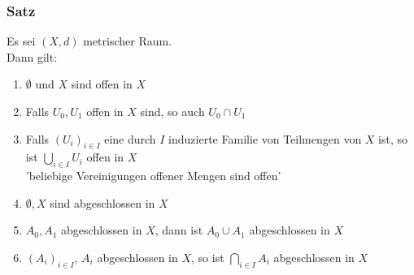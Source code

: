 \subsubsection{Satz} %
\label{ssub:satz}
Es sei $(X,d)$ metrischer Raum. \\
Dann gilt:
\begin{enumerate}
	\item $\emptyset$ und $X$ sind offen in $X$
	\item Falls $U_0,U_1$ offen in $X$ sind, so auch $U_0 \cap U_1$
	\item Falls $(U_i)_{i \in I}$ eine durch $I$ induzierte Familie von Teilmengen von $X$ ist, so ist $\bigcup\limits_{i \in I}U_i$ offen in $X$ \\
		'beliebige Vereinigungen offener Mengen sind offen'
	\item $\emptyset,X$ sind abgeschlossen in $X$
	\item $A_0,A_1$ abgeschlossen in $X$, dann ist $A_0 \cup A_1$ abgeschlossen in $X$
	\item $(A_i)_{i \in I}$, $A_i$ abgeschlossen in $X$, so ist $\bigcap\limits_{i \in I}A_i$ abgeschlossen in $X$
\end{enumerate}

